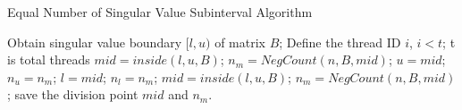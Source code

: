 \begin{algorithm}
\caption{Equal Number of Singular Value Subinterval Algorithm}
\label{alg:numsub}
\begin{algorithmic}[1]
  \State Obtain singular value boundary $[l,u)$ of matrix $B$;
  \State Define the thread ID $i$, $i<t$;
  \Comment t is total threads
  \State $mid = inside(l, u, B)$;
  \State $n_m = NegCount(n, B, mid)$;
      \State $u=mid$;
      \State $n_u=n_m$;
    \Else
      \State $l=mid$;
      \State $n_l=n_m$;
    \EndIf
    \State $mid = inside(l, u, B)$;
    \State $n_m = NegCount(n, B, mid)$;
  \EndWhile
  \State save the division point $mid$ and $n_m$.
\EndProcedure
\end{algorithmic}
\end{algorithm}
